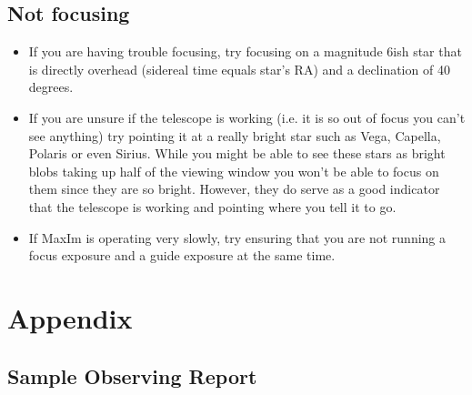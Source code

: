 \documentclass[11pt]{report}
\begin{document}
\section{Not focusing}
\begin{itemize}
\item If you are having trouble focusing, try focusing on a magnitude 6ish star that is directly overhead (sidereal time equals star's RA) and a declination of 40 degrees.
\item If you are unsure if the telescope is working (i.e. it is so out of focus you can't see anything) try pointing it at a really bright star such as Vega, Capella, Polaris or even Sirius. While you might be able to see these stars as bright blobs taking up half of the viewing window you won't be able to focus on them since they are so bright. However, they do serve as a good indicator that the telescope is working and pointing where you tell it to go.
\item If MaxIm is operating very slowly, try ensuring that you are not running a focus exposure and a guide exposure at the same time.
\end{itemize}


\chapter{Appendix}

\section{Sample Observing Report}
\end{document}
